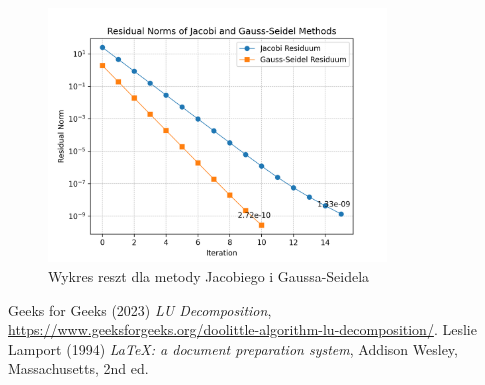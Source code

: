 \documentclass[a4paper,12pt]{article}  %
\begin{document}
\begin{figure}[H]
  \centering
  \includegraphics[width=0.8\textwidth]{./graphs/residuals_task_a.png}
  \caption{Wykres reszt dla metody Jacobiego i Gaussa-Seidela}

\end{figure}

\pagebreak

\begin{thebibliography}{9}
Geeks for Geeks (2023) \emph{LU Decomposition}, \url{https://www.geeksforgeeks.org/doolittle-algorithm-lu-decomposition/}.
Leslie Lamport (1994) \emph{\LaTeX: a document preparation system}, Addison
Wesley, Massachusetts, 2nd ed.
\end{thebibliography}

\printbibliography
\end{document}
